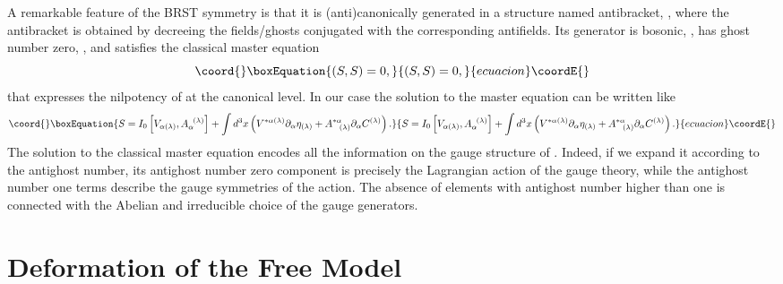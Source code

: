 \documentclass[a4paper,11pt]{article}
\begin{document}
A remarkable feature of the BRST symmetry is that it is (anti)canonically
generated in a structure named antibracket, \coordHE{}%
, where the antibracket is obtained by decreeing the fields/ghosts
conjugated with the corresponding antifields. Its generator is bosonic, \coordHE{}, has ghost number zero, \coordHE{}, and satisfies the classical master equation
\begin{equation}\coord{}\boxEquation{
\left( S,S\right) =0,  \label{bf49}
}{
\left( S,S\right) =0,  }{ecuacion}\coordE{}\end{equation}
that expresses the nilpotency of \coordHE{} at the canonical level. In our case the
solution to the master equation can be written like
\begin{equation}\coord{}\boxEquation{
S=I_{0}\left[ V_{\alpha (\lambda )},A_{\alpha }^{\;\;(\lambda )}\right]
+\int d^{3}x\left( V^{*\alpha (\lambda )}\partial _{\alpha }\eta _{(\lambda
)}+A_{\;\;\;(\lambda )}^{*\alpha }\partial _{\alpha }C^{(\lambda )}\right) .
\label{bf48}
}{
S=I_{0}\left[ V_{\alpha (\lambda )},A_{\alpha }^{\;\;(\lambda )}\right]
+\int d^{3}x\left( V^{*\alpha (\lambda )}\partial _{\alpha }\eta _{(\lambda
)}+A_{\;\;\;(\lambda )}^{*\alpha }\partial _{\alpha }C^{(\lambda )}\right) .
}{ecuacion}\coordE{}\end{equation}
The solution to the classical master equation encodes all the information on
the gauge structure of \coordHE{}. Indeed, if we expand it according to the
antighost number, its antighost number zero component is precisely the
Lagrangian action \coordHE{} of the gauge theory, while the antighost number
one terms describe the gauge symmetries of the action. The absence of
elements with antighost number higher than one is connected with the Abelian
and irreducible choice of the gauge generators.

\section{Deformation of the Free Model}
\end{document}
